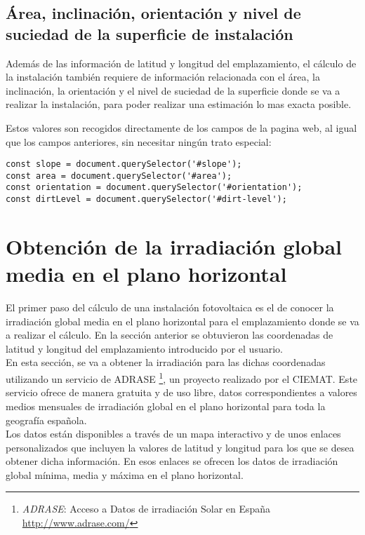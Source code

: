 \subsection{Área, inclinación, orientación y nivel de suciedad de la superficie de instalación}

Además de las información de latitud y longitud del emplazamiento, el cálculo de la instalación también requiere de información relacionada con el área, la inclinación, la orientación y el nivel de suciedad de la superficie donde se va a realizar la instalación, para poder realizar una estimación lo mas exacta posible.

Estos valores son recogidos directamente de los campos de la pagina web, al igual que los campos anteriores, sin necesitar ningún trato especial:\\
\begin{lstlisting}[style=ES6, caption={Variables correspondientes a los campos indicados}]
const slope = document.querySelector('#slope');
const area = document.querySelector('#area');
const orientation = document.querySelector('#orientation');
const dirtLevel = document.querySelector('#dirt-level');
\end{lstlisting}

\section{Obtención de la irradiación global media en el plano horizontal}

El primer paso del cálculo de una instalación fotovoltaica es el de conocer la irradiación global media en el plano horizontal para el emplazamiento donde se va a realizar el cálculo. En la sección anterior se obtuvieron las coordenadas de latitud y longitud del emplazamiento introducido por el usuario.\\

En esta sección, se va a obtener la irradiación para las dichas coordenadas utilizando un servicio de ADRASE \footnote{\textit{ADRASE}: Acceso a Datos de irradiación Solar en España \url{http://www.adrase.com/}}, un proyecto realizado por el CIEMAT. Este servicio ofrece de manera gratuita y de uso libre, datos correspondientes a valores medios mensuales de irradiación global en el plano horizontal para toda la geografía española.\\

Los datos están disponibles a través de un mapa interactivo y de unos enlaces personalizados que incluyen la valores de latitud y longitud para los que se desea obtener dicha información. En esos enlaces se ofrecen los datos de irradiación global mínima, media y máxima en el plano horizontal.\\

